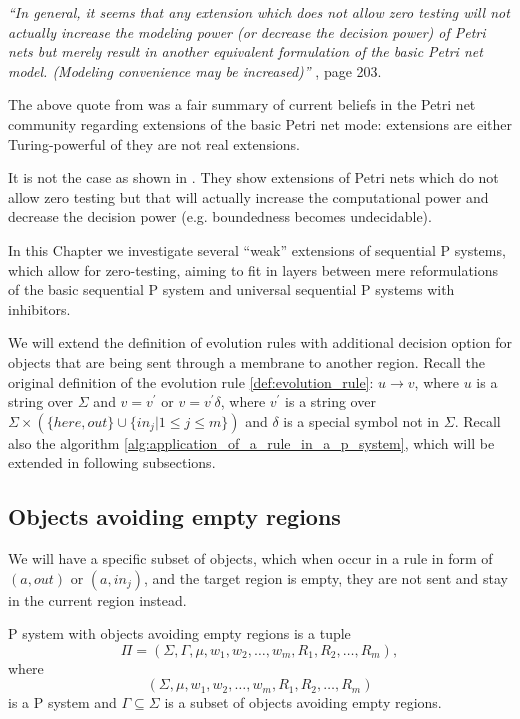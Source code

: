{\em ``In general, it seems that any extension which does not allow zero testing will not actually increase the modeling power (or decrease the decision power) of Petri nets but merely result in another equivalent formulation of the basic Petri net model. (Modeling convenience may be increased)''} \cite{Peterson81PetriNets}, page 203.

The above quote from \cite{Peterson81PetriNets} was a fair summary of current beliefs in the Petri net community regarding extensions of the basic Petri net mode: extensions are either Turing-powerful of they are not real extensions.

It is not the case as shown in \cite{Dufourd98Reset}. They show extensions of Petri nets which do not allow zero testing but that will actually increase the computational power and decrease the decision power (e.g. boundedness becomes undecidable).

In this Chapter we investigate several ``weak'' extensions of sequential P systems, which allow for zero-testing, aiming to fit in layers between mere reformulations of the basic sequential P system and universal sequential P systems with inhibitors.

We will extend the definition of evolution rules with additional decision option for objects that are being sent through a membrane to another region. Recall the original definition of the evolution rule \ref{def:evolution_rule}: $u\rightarrow v$, where $u$ is a string over $\Sigma$ and $v=v^\prime$ or $v=v^\prime\delta$, where $v^\prime$ is a string over $\Sigma\times(\{here, out\}\cup\{in_j|1\leq j\leq m\})$ and $\delta$ is a special symbol not in $\Sigma$. Recall also the algorithm \ref{alg:application_of_a_rule_in_a_p_system}, which will be extended in following subsections.

\subsection{Objects avoiding empty regions} %
\label{sub:objects_avoiding_empty_regions}

We will have a specific subset of objects, which when occur in a rule in form of $(a, out)$ or $(a, in_j)$, and the target region is empty, they are not sent and stay in the current region instead.

\begin{definition}
  P system with objects avoiding empty regions is a tuple $$\Pi = (\Sigma, \Gamma, \mu, w_1, w_2,\ldots , w_m, R_1, R_2,\ldots , R_m),$$ where $$(\Sigma, \mu, w_1, w_2,\ldots , w_m, R_1, R_2,\ldots , R_m)$$ is a P system and $\Gamma\subseteq\Sigma$ is a subset of objects avoiding empty regions.
\end{definition}

